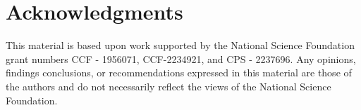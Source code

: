 \documentclass[colorlinks,upint,subscriptcorrection,varvw,hyphenate,balance,greek,russian,vietnamese,german]{asmeconf} %
\begin{document}
\section*{Acknowledgments}
This material is based upon work supported by the National Science Foundation grant numbers 
CCF - 1956071, %
CCF-2234921, %
and 	
CPS - 2237696. %
Any opinions, findings conclusions, or recommendations expressed in this material are those of the authors and do not necessarily reflect the views of 
%
the National Science Foundation.
\end{document}
